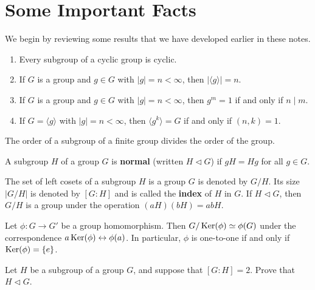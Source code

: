 \section{Some Important Facts}

We begin by reviewing some results that we have developed earlier in these notes.

\begin{theorem} \mbox{}
 \begin{enumerate}\renewcommand{\theenumi}{\alph{enumi}}
  \item
        Every subgroup of a cyclic group is cyclic.
  \item
        If $G$ is a group and $g\in G$ with $|g|=n<\infty$, then $|\langle g \rangle|=n$.
  \item
        If $G$ is a group and $g\in G$ with $|g|=n<\infty$, then $g^m = 1$ if and only if $n \mid m$.
  \item
        If $G = \langle g \rangle$ with $|g|=n<\infty$, then $\langle g^k \rangle = G$  if and only if $(n,k)=1$.
 \end{enumerate}
\end{theorem}

\begin{theorem}[Lagrange]
 The order of a subgroup of a finite group divides the order of the group.
\end{theorem}

\begin{definition}
 A subgroup $H$ of a group $G$ is \textbf{normal} (written $H\lhd G$) if $gH = Hg$ for all $g\in G$.
\end{definition}

\begin{theorem}
 The set of left cosets of a subgroup $H$ is a group $G$ is denoted by $G/H$. Its size $|G/H|$ is denoted by $[G:H]$ and is called the \textbf{index} of $H$ in $G$.
 If $H\lhd G$, then $G/H$ is a group under the operation $(aH)(bH)=abH$.
\end{theorem}

\begin{theorem}
 Let $\phi:G \longrightarrow G'$ be a group homomorphism. Then $G/\operatorname{Ker}(\phi) \simeq \phi(G)$ under the correspondence $a\operatorname{Ker}(\phi) \leftrightarrow \phi(a)$. In particular, $\phi$ is one-to-one if and only if $\operatorname{Ker}(\phi) = \{e\}$.
\end{theorem}

\begin{problem}\label{prob:index2norm}
Let $H$ be a subgroup of a group $G$, and suppose that $[G : H] = 2$.  Prove that $H \lhd G$.
\begin{annotation}
\end{annotation}
\end{problem}

